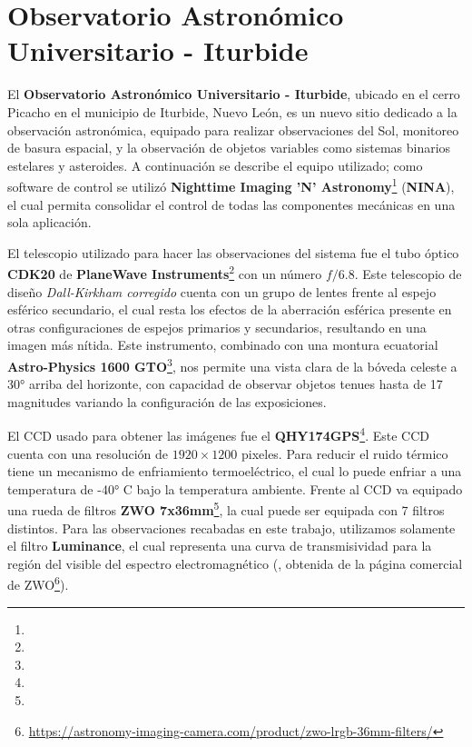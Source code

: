 \section{Observatorio Astronómico Universitario - Iturbide} \label{muestra:observaciones:oau}

El \textbf{Observatorio Astronómico Universitario - Iturbide}, ubicado en el
cerro Picacho en el municipio de Iturbide, Nuevo León, es un nuevo sitio
dedicado a la observación astronómica, equipado para realizar observaciones del
Sol, monitoreo de basura espacial, y la observación de objetos variables como
sistemas binarios estelares y asteroides. A continuación se describe el equipo
utilizado; como software de control se utilizó \textbf{Nighttime Imaging 'N'
Astronomy}\footnote{} (\textbf{NINA}), el
cual permita consolidar el control de todas las componentes mecánicas en una
sola aplicación. 

El telescopio utilizado para hacer las observaciones del sistema fue el tubo
óptico \textbf{CDK20} de \textbf{PlaneWave
Instruments}\footnote{} con un
número $f/6.8$. Este telescopio de diseño \textit{Dall-Kirkham corregido} cuenta
con un grupo de lentes frente al espejo esférico secundario, el cual resta los
efectos de la aberración esférica presente en otras configuraciones de espejos
primarios y secundarios, resultando en una imagen más nítida. Este instrumento,
combinado con una montura ecuatorial \textbf{Astro-Physics 1600
GTO}\footnote{}, nos permite una
vista clara de la bóveda celeste a \ang{30} arriba del horizonte, con capacidad
de observar objetos tenues hasta de 17 magnitudes variando la configuración de
las exposiciones.

El CCD usado para obtener las imágenes fue el
\textbf{QHY174GPS}\footnote{}.
Este CCD cuenta con una resolución de $1920 \times 1200$ pixeles. Para reducir
el ruido térmico tiene un mecanismo de enfriamiento termoeléctrico, el cual lo
puede enfriar a una temperatura de -\ang{40} C bajo la temperatura ambiente.
Frente al CCD va equipado una rueda de filtros \textbf{ZWO
7x36mm}\footnote{},
la cual puede ser equipada con 7 filtros distintos. Para las observaciones
recabadas en este trabajo, utilizamos solamente el filtro \textbf{Luminance}, el
cual representa una curva de transmisividad para la región del visible del
espectro electromagnético (, obtenida de
la página comercial de
ZWO\footnote{\url{https://astronomy-imaging-camera.com/product/zwo-lrgb-36mm-filters/}}). 

